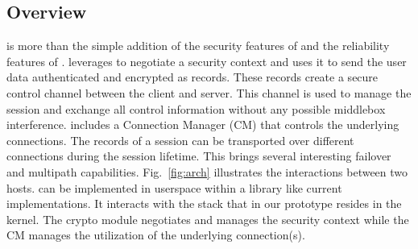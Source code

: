 



\subsection{Overview}

\tcpls is more than the simple addition of the security features
of \tls and the reliability features of \tcp. \tcpls leverages  to
negotiate a security context and uses it to send the user data authenticated and
encrypted as \tls records. These records create a secure
control channel between the client and server. This channel is used to manage
the \tcpls session and exchange all control information without any possible
middlebox interference. \tcpls includes a Connection Manager (CM) that
controls the underlying \tcp connections. The \tls records of a \tcpls session can
be transported over different \tcp connections during the session lifetime. This
brings several interesting failover and multipath capabilities.
Fig.~\ref{fig:arch} illustrates the interactions between two \tcpls hosts.
\tcpls can be implemented in userspace within a library like current \tls
implementations. It interacts with the \tcp stack that in our prototype resides
in the kernel. The crypto module negotiates and manages the security context
while the CM manages the utilization of the underlying \tcp connection(s).




